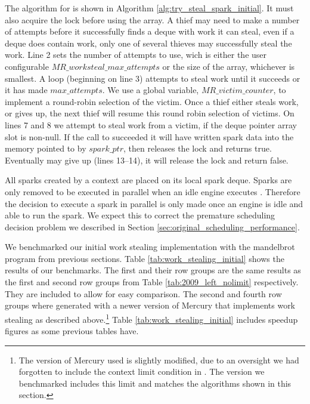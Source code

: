 The algorithm for \trystealspark is shown in
Algorithm \ref{alg:try_steal_spark_initial}.
It must also acquire the lock before using the array.
A thief may need to make a number of attempts before it successfully finds a
deque with work it can steal,
even if a deque does contain work, only one of several thieves may
successfully steal the work.
Line 2 sets the number of attempts to use, wich is either the user
configurable $MR\_worksteal\_max\_attempts$ or the size of the array,
whichever is smallest.
A loop (beginning on line 3) attempts to steal work until it succeeds or it
has made $max\_attempts$.
We use a global variable, $MR\_victim\_counter$,
to implement a round-robin selection of the victim.
Once a thief either steals work, or gives up, the next thief will resume
this round robin selection of victims.
On lines 7 and 8 we attempt to steal work from a victim,
if the deque pointer array slot is non-null.
If the call to \steal succeeded it will have written spark data into the
memory pointed to by $spark\_ptr$,
then \trystealspark releases the lock and returns true.
Eventually \trystealspark may give up (lines 13--14),
it will release the lock and return false.

All sparks created by a context are placed on its local spark deque.
Sparks are only removed to be executed in parallel when an idle engine
executes \trystealspark.
Therefore
the decision to execute a spark in parallel is only made once an engine is
idle and able to run the spark.
We expect this to correct the premature scheduling decision problem we
described in Section \ref{sec:original_scheduling_performance}.



We benchmarked our initial work stealing implementation with the mandelbrot
program from previous sections.
Table \ref{tab:work_stealing_initial} shows the results of our benchmarks.
The first and their row groups are the same results as the first and second
row groups from Table \ref{tab:2009_left_nolimit} respectively.
They are included to allow for easy comparison.
The second and fourth row groups where generated with a newer version of
Mercury that implements work stealing as described above.\footnote{
    The version of Mercury used is slightly modified,
    due to an oversight we had forgotten to include the context limit
    condition in \getglobalwork.
    The version we benchmarked includes this limit and matches the
    algorithms shown in this section.}
Table \ref{tab:work_stealing_initial} includes speedup figures as some
previous tables have.

